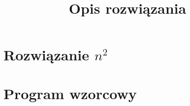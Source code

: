 \documentclass[12pt]{article}
\title{Opis rozwiązania}
\date{} %
\begin{document}
\maketitle

\section{Rozwiązanie $n^2$}


\section{Program wzorcowy}
\end{document}
